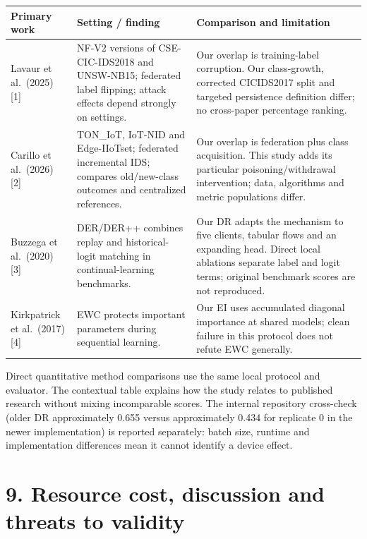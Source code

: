 \documentclass[
  10pt,
]{article}
\begin{document}
\begin{longtable}[]{@{}
  >{\raggedright\arraybackslash}p{}
  >{\raggedright\arraybackslash}p{}
  >{\raggedright\arraybackslash}p{}@{}}
\toprule
Primary work & Setting / finding & Comparison and limitation \\
\midrule
\endhead
Lavaur et al.~(2025) {[}1{]} & NF-V2 versions of CSE-CIC-IDS2018 and
UNSW-NB15; federated label flipping; attack effects depend strongly on
settings. & Our overlap is training-label corruption. Our class-growth,
corrected CICIDS2017 split and targeted persistence definition differ;
no cross-paper percentage ranking. \\
Carillo et al.~(2026) {[}2{]} & TON\_IoT, IoT-NID and Edge-IIoTset;
federated incremental IDS; compares old/new-class outcomes and
centralized references. & Our overlap is federation plus class
acquisition. This study adds its particular poisoning/withdrawal
intervention; data, algorithms and metric populations differ. \\
Buzzega et al.~(2020) {[}3{]} & DER/DER++ combines replay and
historical-logit matching in continual-learning benchmarks. & Our DR
adapts the mechanism to five clients, tabular flows and an expanding
head. Direct local ablations separate label and logit terms; original
benchmark scores are not reproduced. \\
Kirkpatrick et al.~(2017) {[}4{]} & EWC protects important parameters
during sequential learning. & Our EI uses accumulated diagonal
importance at shared models; clean failure in this protocol does not
refute EWC generally. \\
\bottomrule
\end{longtable}

Direct quantitative method comparisons use the same local protocol and
evaluator. The contextual table explains how the study relates to
published research without mixing incomparable scores. The internal
repository cross-check (older DR approximately 0.655 versus
approximately 0.434 for replicate 0 in the newer implementation) is
reported separately: batch size, runtime and implementation differences
mean it cannot identify a device effect.

\hypertarget{resource-cost-discussion-and-threats-to-validity}{%
\section{9. Resource cost, discussion and threats to
validity}\label{resource-cost-discussion-and-threats-to-validity}}
\end{document}
